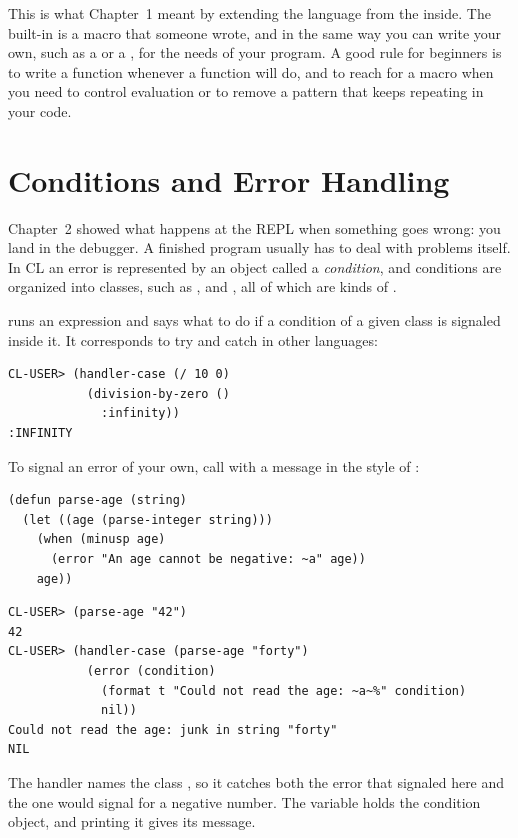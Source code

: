 This is what Chapter~1 meant by extending the language from the
inside. The built-in  is a macro that someone
wrote, and in the same way you can write your own, such as a
 or a , for the needs of
your program. A good rule for beginners is to
write a function whenever a function will do, and to reach for a macro
when you need to control evaluation or to remove a pattern that keeps
repeating in your code.

\section{Conditions and Error Handling}
\label{sec:conditions}

Chapter~2 showed what happens at the REPL when something goes wrong:
you land in the debugger. A finished program usually has to deal with
problems itself. In CL an error is represented by an object called a
\emph{condition}, and conditions are organized into classes, such as
,  and , all
of which are kinds of .

 runs an expression and says what to do if a
condition of a given class is signaled inside it. It corresponds to
try and catch in other languages:

\begin{verbatim}
CL-USER> (handler-case (/ 10 0)
           (division-by-zero ()
             :infinity))
:INFINITY
\end{verbatim}

To signal an error of your own, call  with a message in
the style of :

\begin{verbatim}
(defun parse-age (string)
  (let ((age (parse-integer string)))
    (when (minusp age)
      (error "An age cannot be negative: ~a" age))
    age))
\end{verbatim}

\begin{verbatim}
CL-USER> (parse-age "42")
42
CL-USER> (handler-case (parse-age "forty")
           (error (condition)
             (format t "Could not read the age: ~a~%" condition)
             nil))
Could not read the age: junk in string "forty"
NIL
\end{verbatim}

The handler names the class , so it catches both the
error that  signaled here and the one
 would signal for a negative number. The variable
 holds the condition object, and printing it gives
its message.

